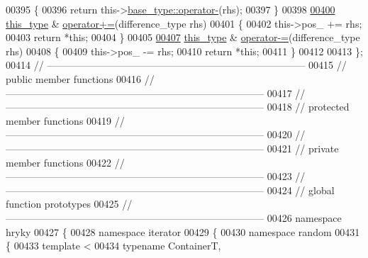 \begin{DoxyCode}
00395 \textcolor{keyword}{    }\{
00396         \textcolor{keywordflow}{return} this->\hyperlink{classhryky_1_1iterator_1_1random_1_1_base_a0c758ff331507eb57f757ac475bdf987}{base_type::operator-}(rhs);
00397     \}
00398 
\hypertarget{iterator__random_8h_source_l00400}{}\hyperlink{classhryky_1_1iterator_1_1random_1_1_immutable_aba1ed8aa231d59c1c3e57f5bec2e177f}{00400}     \hyperlink{classhryky_1_1iterator_1_1random_1_1_immutable}{this_type} & \hyperlink{classhryky_1_1iterator_1_1random_1_1_immutable_aba1ed8aa231d59c1c3e57f5bec2e177f}{operator+=}(difference\_type rhs)
00401     \{
00402         this->pos\_ += rhs;
00403         \textcolor{keywordflow}{return} *\textcolor{keyword}{this};
00404     \}
00405 
\hypertarget{iterator__random_8h_source_l00407}{}\hyperlink{classhryky_1_1iterator_1_1random_1_1_immutable_a770e915a3a02d5ca88db4fe8efca1ebb}{00407}     \hyperlink{classhryky_1_1iterator_1_1random_1_1_immutable}{this_type} & \hyperlink{classhryky_1_1iterator_1_1random_1_1_immutable_a770e915a3a02d5ca88db4fe8efca1ebb}{operator-=}(difference\_type rhs)
00408     \{
00409         this->pos\_ -= rhs;
00410         \textcolor{keywordflow}{return} *\textcolor{keyword}{this};
00411     \}
00412 
00413 \};
00414 \textcolor{comment}{//
      ------------------------------------------------------------------------------}
00415 \textcolor{comment}{// public member functions}
00416 \textcolor{comment}{//
      ------------------------------------------------------------------------------}
00417 \textcolor{comment}{//
      ------------------------------------------------------------------------------}
00418 \textcolor{comment}{// protected member functions}
00419 \textcolor{comment}{//
      ------------------------------------------------------------------------------}
00420 \textcolor{comment}{//
      ------------------------------------------------------------------------------}
00421 \textcolor{comment}{// private member functions}
00422 \textcolor{comment}{//
      ------------------------------------------------------------------------------}
00423 \textcolor{comment}{//
      ------------------------------------------------------------------------------}
00424 \textcolor{comment}{// global function prototypes}
00425 \textcolor{comment}{//
      ------------------------------------------------------------------------------}
00426 \textcolor{keyword}{namespace }hryky
00427 \{
00428 \textcolor{keyword}{namespace }iterator
00429 \{
00430 \textcolor{keyword}{namespace }random
00431 \{
00433     \textcolor{keyword}{template} <
00434         \textcolor{keyword}{typename} ContainerT,

\end{DoxyCode}
